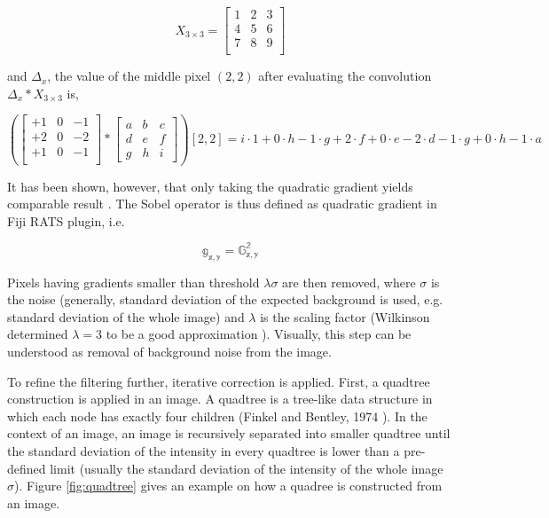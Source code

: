 \documentclass[pdftex,12pt,a4paper]{report}
\begin{document}
\[
X_{3 \times 3} = 
\begin{bmatrix}
1 & 2 & 3 \\
4 & 5 & 6 \\
7 & 8 & 9 \\
\end{bmatrix}
\]

and $\Delta_x$, the value of the middle pixel $(2, 2)$ after evaluating the convolution $\Delta_x * X_{3 \times 3}$ is,

\[
\left( 
\begin{bmatrix}
+1 & 0 & -1 \\
+2 & 0 & -2 \\
+1 & 0 & -1 \\
\end{bmatrix}
*
\begin{bmatrix}
a & b & c \\
d & e & f \\
g & h & i
\end{bmatrix}
\right) [2,2]
= i \cdot 1 + 0 \cdot h - 1 \cdot g + 2 \cdot f + 0 \cdot e - 2 \cdot d - 1 \cdot g + 0 \cdot h - 1 \cdot a
\]

It has been shown, however, that only taking the quadratic gradient yields comparable result \cite{wilkinson1998digital}. The Sobel operator is thus defined as quadratic gradient in Fiji RATS plugin, i.e.

$$
\mathbb{g_{x, y}} = \mathbb{G_{x, y}^2}
$$

Pixels having gradients smaller than threshold $\lambda \sigma$ are then removed, where $\sigma$ is the noise (generally, standard deviation of the expected background is used, e.g. standard deviation of the whole image) and $\lambda$ is the scaling factor (Wilkinson determined $\lambda = 3$ to be a good approximation \cite{wilkinson1998digital}). Visually, this step can be understood as removal of background noise from the image.

To refine the filtering further, iterative correction is applied. First, a quadtree construction is applied in an image. A quadtree is a tree-like data structure in which each node has exactly four children (Finkel and Bentley, 1974 \cite{finkel1974quad}). In the context of an image, an image is recursively separated into smaller quadtree until the standard deviation of the intensity in every quadtree is lower than a pre-defined limit (usually the standard deviation of the intensity of the whole image $\sigma$). Figure \ref{fig:quadtree} gives an example on how a quadree is constructed from an image.
\end{document}
